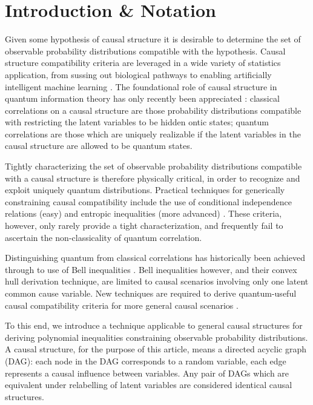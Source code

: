\section{Introduction \& Notation}
Given some hypothesis of causal structure it is desirable to determine the set of observable probability distributions compatible with the hypothesis. Causal structure compatibility criteria are leveraged in a wide variety of statistics application, from sussing out biological pathways to enabling artificially intelligent machine learning \cite{pearl2009causality,spirtes2011causation,studeny2005probabilistic,koller2009probabilistic}. The foundational role of causal structure in quantum information theory has only recently been appreciated \cite{WoodSpekkens,fritz2012bell,pusey2014gdag,BeyondBellII}: classical correlations on a causal structure are those probability distributions compatible with restricting the latent variables to be hidden ontic states; quantum correlations are those which are uniquely realizable if the latent variables in the causal structure are allowed to be quantum states.

Tightly characterizing the set of observable probability distributions compatible with a causal structure is therefore physically critical, in order to recognize and exploit uniquely quantum distributions. Practical techniques for generically constraining causal compatibility include the use of conditional independence relations (easy) \cite{pearl2009causality,spirtes2011causation,studeny2005probabilistic,koller2009probabilistic} and entropic inequalities (more advanced) \cite{fritz2013marginal,chaves2014novel,chaves2014informationinference}. These criteria, however, only rarely provide a tight characterization, and frequently fail to ascertain the non-classicality of quantum correlation.%

Distinguishing quantum from classical correlations has historically been achieved through to use of Bell inequalities \cite{bell1966lhvm,GisinFramework2012,scarani2012device,Brunner2013Bell}. Bell inequalities however, and their convex hull derivation technique, are limited to causal scenarios involving only one latent common cause variable. New techniques are required to derive quantum-useful causal compatibility criteria for more general causal scenarios \cite{fritz2012bell,pusey2014gdag,BeyondBellII}.

To this end, we introduce a technique applicable to general causal structures for deriving polynomial inequalities constraining observable probability distributions. A causal structure, for the purpose of this article, means a directed acyclic graph (DAG): each node in the DAG corresponds to a random variable, each edge represents a causal influence between variables. Any pair of DAGs which are equivalent under relabelling of latent variables are considered identical causal structures.

